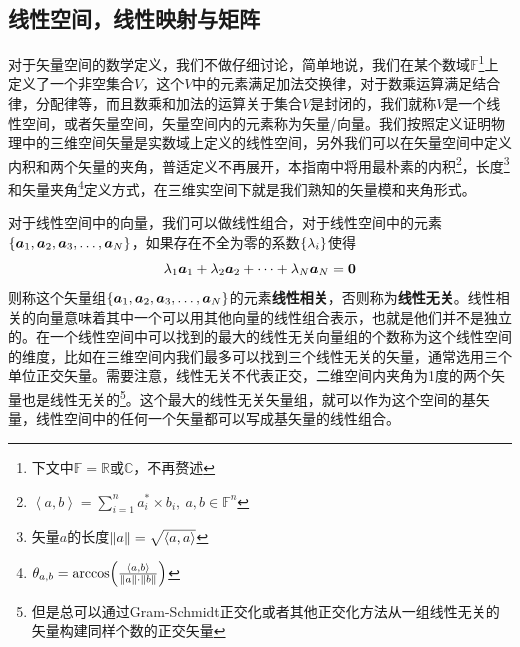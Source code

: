 \documentclass[12pt,a4paper,openany,twoside]{book}
\numberwithin{equation}{section}
\newcommand{\mean}[1]{\left\langle #1 \right\rangle}
\begin{document}
        \subsection{线性空间，线性映射与矩阵}

          对于矢量空间的数学定义，我们不做仔细讨论，简单地说，我们在某个数域$\mathbb{F}$\footnote{下文中$\mathbb{F}=\mathbb{R}$或$\mathbb{C}$，不再赘述}上定义了一个非空集合$V$，这个$V$中的元素满足加法交换律，对于数乘运算满足结合律，分配律等，而且数乘和加法的运算关于集合$V$是封闭的，我们就称$V$是一个线性空间，或者矢量空间，矢量空间内的元素称为矢量/向量。我们按照定义证明物理中的三维空间矢量是实数域上定义的线性空间，另外我们可以在矢量空间中定义内积和两个矢量的夹角，普适定义不再展开，本指南中将用最朴素的内积\footnote{$\mean{a,b}=\sum_{i=1}^n{a_i^*\times b_i},\ a,b\in\mathbb{F}^n$}，长度\footnote{矢量$a$的长度$\norm{a}=\sqrt{\mean{a,a}}$}和矢量夹角\footnote{$\theta_{a,b}=\arccos(\frac{\mean{a,b}}{\norm{a}\cdot\norm{b}})$}定义方式，在三维实空间下就是我们熟知的矢量模和夹角形式。

          对于线性空间中的向量，我们可以做线性组合，对于线性空间中的元素$\qty{\vb*{a}_1,\vb*{a}_2,\vb*{a}_3,\dots,\vb*{a}_N}$，如果存在不全为零的系数$\qty{\lambda_i}$使得
          \begin{equation}
            \lambda_1\vb*{a}_1+\lambda_2\vb*{a}_2+\cdots+\lambda_N\vb*{a}_N=\vb*{0}
          \end{equation}
          则称这个矢量组$\qty{\vb*{a}_1,\vb*{a}_2,\vb*{a}_3,\dots,\vb*{a}_N}$的元素\textbf{线性相关}，否则称为\textbf{线性无关}。线性相关的向量意味着其中一个可以用其他向量的线性组合表示，也就是他们并不是独立的。在一个线性空间中可以找到的最大的线性无关向量组的个数称为这个线性空间的维度，比如在三维空间内我们最多可以找到三个线性无关的矢量，通常选用三个单位正交矢量。需要注意，线性无关不代表正交，二维空间内夹角为1度的两个矢量也是线性无关的\footnote{但是总可以通过Gram-Schmidt正交化或者其他正交化方法从一组线性无关的矢量构建同样个数的正交矢量}。这个最大的线性无关矢量组，就可以作为这个空间的基矢量，线性空间中的任何一个矢量都可以写成基矢量的线性组合。
          
\end{document}
